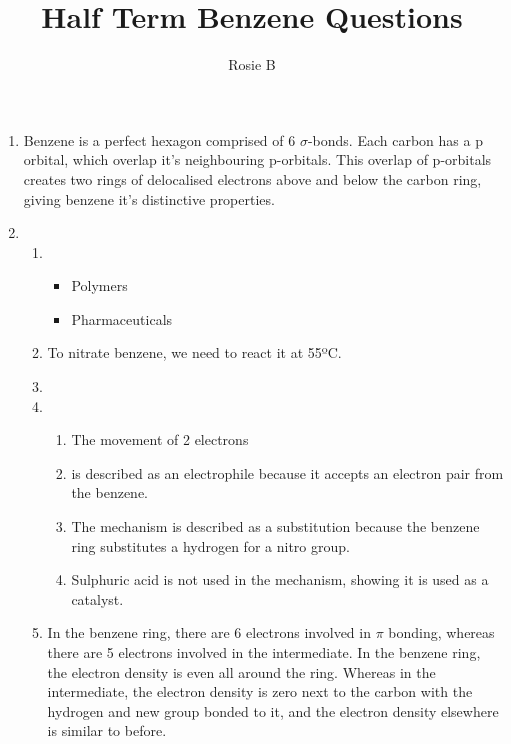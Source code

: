 \documentclass{article}
\title{Half Term Benzene Questions}
\date{}
\author{Rosie B}
\begin{document}
\maketitle
\begin{enumerate}
\item Benzene is a perfect hexagon comprised of 6 $\sigma$-bonds. Each carbon has a p orbital, which overlap it's neighbouring p-orbitals.                 This overlap of p-orbitals creates two rings of delocalised electrons above and below the carbon ring, giving benzene it's distinctive properties.\\

\item \begin{enumerate}
\item \begin{itemize}
\item Polymers\\

\item Pharmaceuticals\\

\end{itemize}

\item To nitrate benzene, we need to react it at 55ºC.\\

\item {}
\item \begin{enumerate}
\item The movement of 2 electrons\\

\item {} is described as an electrophile because it accepts an electron pair from the benzene.\\

\item The mechanism is described as a substitution because the benzene ring substitutes a hydrogen for a nitro group.\\

\item Sulphuric acid is not used in the mechanism, showing it is used as a catalyst.\\

\end{enumerate}

\item In the benzene ring, there are 6 electrons involved in $\pi$ bonding, whereas there are 5 electrons involved in the intermediate. In the benzene ring, the electron density is even all around the ring. Whereas in the intermediate, the electron density is zero next to the carbon with the hydrogen and new group bonded to it, and the electron density elsewhere is similar to before.\\


\end{enumerate}
\end{enumerate}
\end{document}

